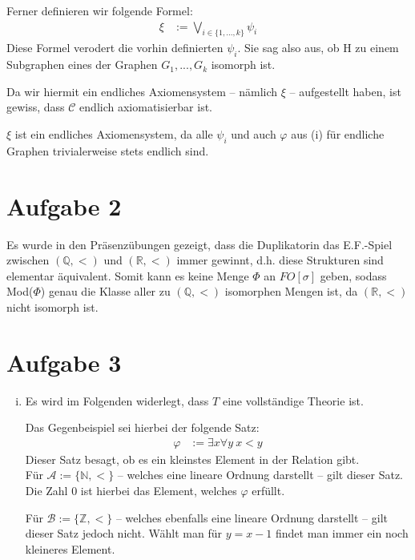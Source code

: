 \documentclass[a4paper,10pt]{article}
\begin{document}
\begin{enumerate}[(i)]
Ferner definieren wir folgende Formel:
\begin{align*}
\xi &:= \bigvee_{i \in \{1,...,k\}} \psi_i
\end{align*}
Diese Formel verodert die vorhin definierten $\psi_i$. Sie sag also aus, ob H zu einem Subgraphen eines der Graphen $G_1,...,G_k$ isomorph ist.

Da wir hiermit ein endliches Axiomensystem -- nämlich $\xi$ -- aufgestellt haben, ist gewiss, dass $\mathcal C$ endlich axiomatisierbar ist.

$\xi$ ist ein endliches Axiomensystem, da alle $\psi_i$ und auch $\varphi$ aus (i) für endliche Graphen trivialerweise stets endlich sind. 

\section*{Aufgabe 2}
Es wurde in den Präsenzübungen gezeigt, dass die Duplikatorin das E.F.-Spiel zwischen $(\mathbb{Q},<)$ und $(\mathbb{R},<)$ immer gewinnt, d.h. diese Strukturen sind elementar äquivalent.
Somit kann es keine Menge $\Phi$ an $FO[\sigma]$ geben, sodass Mod($\Phi$) genau die Klasse aller zu $(\mathbb{Q},<)$ isomorphen Mengen ist, da $(\mathbb{R},<)$ nicht isomorph ist.
\section*{Aufgabe 3}
\begin{enumerate}[(i)]
\item Es wird im Folgenden widerlegt, dass $T$ eine vollständige Theorie ist.

Das Gegenbeispiel sei hierbei der folgende Satz:
\begin{align*}
\varphi &:= \exists x \forall y~ x < y
\end{align*}
Dieser Satz besagt, ob es ein kleinstes Element in der Relation gibt. \\

Für $\mathcal A := \{\mathbb{N},<\}$ -- welches eine lineare Ordnung darstellt -- gilt dieser Satz. Die Zahl $0$ ist hierbei das Element, welches $\varphi$ erfüllt.

Für $\mathcal B := \{\mathbb{Z},<\}$ -- welches ebenfalls eine lineare Ordnung darstellt -- gilt dieser Satz jedoch nicht. Wählt man für $y = x-1$ findet man immer ein noch kleineres Element.\\


\end{enumerate}
\end{enumerate}
\end{document}
